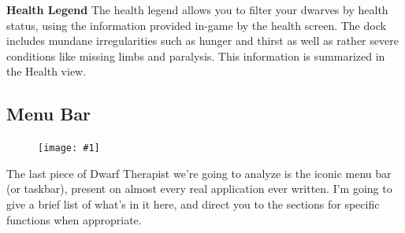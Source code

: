 \documentclass[]{article}
\newcommand{\boldlist}[1] {
\vspace{12pt}
\noindent \textbf{#1}
}
\newcommand{\fullfigure}[1] {
\begin{figure}[h!]
\texttt{[image: \#1]}
\end{figure}
}
\begin{document}
\begin{figure}[h!]
\begin{subfigure}[C]{0.45\linewidth}
        \end{subfigure}
\end{figure}

\boldlist{Health Legend} The health legend allows you to filter your dwarves by health status, using
the information provided in-game by the health screen. The dock includes mundane irregularities such as
hunger and thirst as well as rather severe conditions like missing limbs and paralysis. This information
is summarized in the Health view.

\newpage
\subsection{Menu Bar}
\label{sec:Menu Bar}
\fullfigure{Sec1Fig17}

The last piece of Dwarf Therapist we're going to analyze is the iconic menu bar (or taskbar), present on
almost every real application ever written. I'm going to give a brief list of what's in it here, and
direct you to the sections for specific functions when appropriate.
\end{document}
